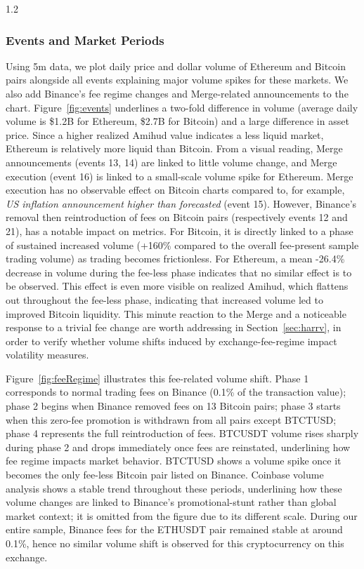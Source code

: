 \documentclass[10pt]{article}
\begin{document}
\begin{setstretch}{1.2}
        \subsubsection{Events and Market Periods}

Using 5m data, we plot daily price and dollar volume of Ethereum and Bitcoin pairs alongside all events explaining major volume spikes for these markets. We also add Binance's fee regime changes and Merge-related announcements to the chart. Figure~\ref{fig:events} underlines a two-fold difference in volume (average daily volume is \$1.2B for Ethereum, \$2.7B for Bitcoin) and a large difference in asset price. Since a higher realized Amihud value indicates a less liquid market, Ethereum is relatively more liquid than Bitcoin. From a visual reading, Merge announcements (events 13, 14) are linked to little volume change, and Merge execution (event 16) is linked to a small-scale volume spike for Ethereum. Merge execution has no observable effect on Bitcoin charts compared to, for example, \textit{US inflation announcement higher than forecasted} (event 15). However, Binance's removal then reintroduction of fees on Bitcoin pairs (respectively events 12 and 21), has a notable impact on metrics. For Bitcoin, it is directly linked to a phase of sustained increased volume (+160\% compared to the overall fee-present sample trading volume) as trading becomes frictionless. For Ethereum, a mean -26.4\% decrease in volume during the fee-less phase indicates that no similar effect is to be observed. This effect is even more visible on realized Amihud, which flattens out throughout the fee-less phase, indicating that increased volume led to improved Bitcoin liquidity. This minute reaction to the Merge and a noticeable response to a trivial fee change are worth addressing in Section~\ref{sec:harrv}, in order to verify whether volume shifts induced by exchange-fee-regime impact volatility measures. 

Figure~\ref{fig:feeRegime} illustrates this fee-related volume shift. Phase 1 corresponds to normal trading fees on Binance (0.1\% of the transaction value); phase 2 begins when Binance removed fees on 13 Bitcoin pairs; phase 3 starts when this zero-fee promotion is withdrawn from all pairs except BTCTUSD; phase 4 represents the full reintroduction of fees. BTCUSDT volume rises sharply during phase 2 and drops immediately once fees are reinstated, underlining how fee regime impacts market behavior. BTCTUSD shows a volume spike once it becomes the only fee-less Bitcoin pair listed on Binance. Coinbase volume analysis shows a stable trend throughout these periods, underlining how these volume changes are linked to Binance's promotional-stunt rather than global market context; it is omitted from the figure due to its different scale. During our entire sample, Binance fees for the ETHUSDT pair remained stable at around 0.1\%, hence no similar volume shift is observed for this cryptocurrency on this exchange. 


\end{setstretch}
\end{document}
